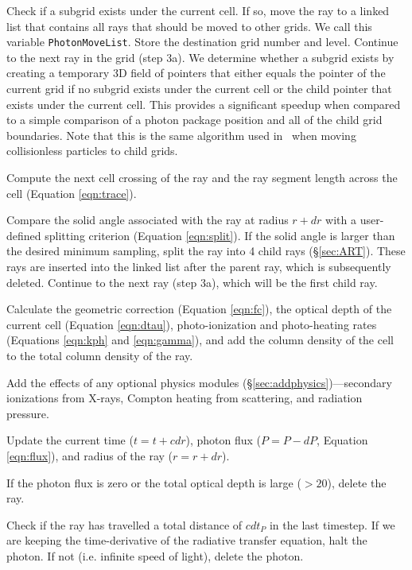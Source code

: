 \documentclass[apj,onecolumn]{emulateapj}
\begin{document}
 Check if a subgrid exists under the current cell.  If so,
move the ray to a linked list that contains all rays that should be
moved to other grids.  We call this variable \texttt{PhotonMoveList}.
Store the destination grid number and level.  Continue to the next ray
in the grid (step 3a).  We determine whether a subgrid exists by
creating a temporary 3D field of pointers that either equals the
pointer of the current grid if no subgrid exists under the current
cell or the child pointer that exists under the current cell.  This
provides a significant speedup when compared to a simple comparison
of a photon package position and all of the child grid boundaries.
Note that this is the same algorithm used in \enzo~when moving
collisionless particles to child grids.

 Compute the next cell crossing of the ray and the ray
segment length across the cell (Equation \ref{eqn:trace}).

 Compare the solid angle associated with the ray at radius
$r+dr$ with a user-defined splitting criterion (Equation
\ref{eqn:split}).  If the solid angle is larger than the desired
minimum sampling, split the ray into 4 child rays (\S\ref{sec:ART}).
These rays are inserted into the linked list after the parent ray,
which is subsequently deleted.  Continue to the next ray (step 3a),
which will be the first child ray.

 Calculate the geometric correction (Equation \ref{eqn:fc}),
the optical depth of the current cell (Equation \ref{eqn:dtau}),
photo-ionization and photo-heating rates (Equations \ref{eqn:kph} and
\ref{eqn:gamma}), and add the column density of the cell to the total
column density of the ray.

 Add the effects of any optional physics modules
(\S\ref{sec:addphysics})---secondary ionizations from X-rays, Compton
heating from scattering, and radiation pressure.

 Update the current time ($t = t + cdr$), photon flux ($P = P
- dP$, Equation \ref{eqn:flux}), and radius of the ray ($r = r + dr$).

 If the photon flux is zero or the total optical depth is
large ($>20$), delete the ray.

 Check if the ray has travelled a total distance of $c dt_P$
in the last timestep.  If we are keeping the time-derivative of the
radiative transfer equation, halt the photon.  If not (i.e. infinite
speed of light), delete the photon.
\end{document}
